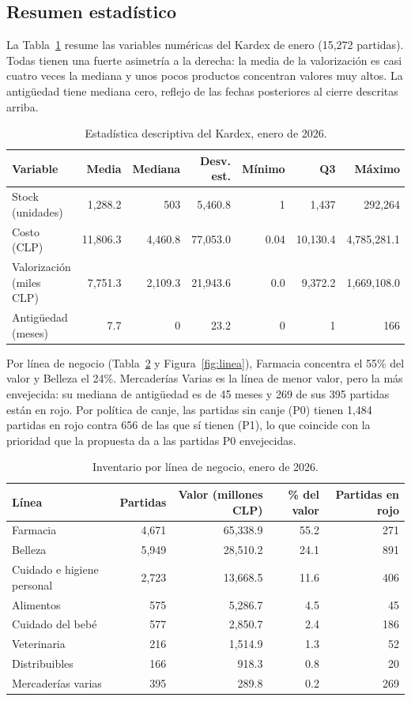 \documentclass[11pt,letterpaper]{article}
\begin{document}
\subsection{Resumen estadístico}

La Tabla~\ref{tab:desc} resume las variables numéricas del Kardex de enero (15,272 partidas). Todas tienen una fuerte asimetría a la derecha: la media de la valorización es casi cuatro veces la mediana y unos pocos productos concentran valores muy altos. La antigüedad tiene mediana cero, reflejo de las fechas posteriores al cierre descritas arriba.

\begin{table}[h]
\centering\small
\begin{tabular}{@{}lrrrrrr@{}}
\toprule
Variable & Media & Mediana & Desv. est. & Mínimo & Q3 & Máximo \\
\midrule
Stock (unidades) & 1,288.2 & 503 & 5,460.8 & 1 & 1,437 & 292,264 \\
Costo (CLP) & 11,806.3 & 4,460.8 & 77,053.0 & 0.04 & 10,130.4 & 4,785,281.1 \\
Valorización (miles CLP) & 7,751.3 & 2,109.3 & 21,943.6 & 0.0 & 9,372.2 & 1,669,108.0 \\
Antigüedad (meses) & 7.7 & 0 & 23.2 & 0 & 1 & 166 \\
\bottomrule
\end{tabular}
\caption{Estadística descriptiva del Kardex, enero de 2026.}
\label{tab:desc}
\end{table}

Por línea de negocio (Tabla~\ref{tab:linea} y Figura~\ref{fig:linea}), Farmacia concentra el 55\% del valor y Belleza el 24\%. Mercaderías Varias es la línea de menor valor, pero la más envejecida: su mediana de antigüedad es de 45 meses y 269 de sus 395 partidas están en rojo. Por política de canje, las partidas sin canje (P0) tienen 1,484 partidas en rojo contra 656 de las que sí tienen (P1), lo que coincide con la prioridad que la propuesta da a las partidas P0 envejecidas.

\begin{table}[h]
\centering\small
\begin{tabular}{@{}lrrrr@{}}
\toprule
Línea & Partidas & Valor (millones CLP) & \% del valor & Partidas en rojo \\
\midrule
Farmacia & 4,671 & 65,338.9 & 55.2 & 271 \\
Belleza & 5,949 & 28,510.2 & 24.1 & 891 \\
Cuidado e higiene personal & 2,723 & 13,668.5 & 11.6 & 406 \\
Alimentos & 575 & 5,286.7 & 4.5 & 45 \\
Cuidado del bebé & 577 & 2,850.7 & 2.4 & 186 \\
Veterinaria & 216 & 1,514.9 & 1.3 & 52 \\
Distribuibles & 166 & 918.3 & 0.8 & 20 \\
Mercaderías varias & 395 & 289.8 & 0.2 & 269 \\
\bottomrule
\end{tabular}
\caption{Inventario por línea de negocio, enero de 2026.}
\label{tab:linea}
\end{table}
\end{document}
